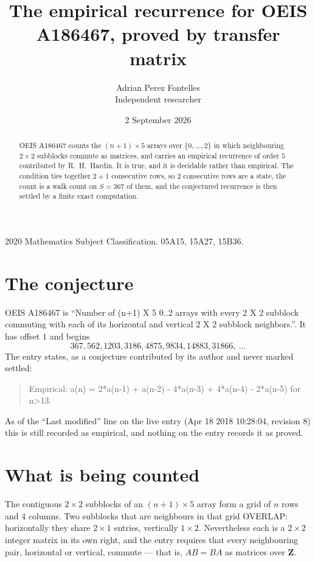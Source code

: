 \documentclass[11pt,a4paper]{article}
\title{The empirical recurrence for OEIS A186467, proved by transfer matrix}
\author{Adrian Perez Fontelles\\ \small Independent researcher}
\date{2 September 2026}
\theoremstyle{plain}
\theoremstyle{definition}
\begin{document}
\maketitle

\begin{abstract}
OEIS A186467 counts the $(n+1)\times5$ arrays over $\{0,\dots,2\}$ in which
neighbouring $2\times2$ subblocks commute as matrices, and carries an empirical recurrence
of order $5$ contributed by R.~H.~Hardin. It is true, and it is decidable rather than
empirical. The condition ties together $2+1$ consecutive rows, so $2$ consecutive rows are
a state, the count is a walk count on $S=367$ of them, and the conjectured recurrence is then
settled by a finite exact computation.
\end{abstract}

\noindent\small 2020 Mathematics Subject Classification. 05A15, 15A27, 15B36.\normalsize

\section{The conjecture}

OEIS A186467 is ``Number of (n+1) X 5 0..2 arrays with every 2 X 2 subblock commuting with each of its horizontal and vertical 2 X 2 subblock neighbors.''. It has offset $1$ and begins
\[
367, 562, 1203, 3186, 4875, 9834, 14883, 31866,\ \dots
\]
The entry states, as a conjecture contributed by its author and never marked settled:
\begin{quote}
Empirical: a(n) = 2*a(n-1) + a(n-2) - 4*a(n-3) + 4*a(n-4) - 2*a(n-5) for n>13.
\end{quote}
As of the ``Last modified'' line on the live entry (Apr 18 2018 10:28:04, revision 8) this is still
recorded as empirical, and nothing on the entry records it as proved.

\section{What is being counted}

The contiguous $2\times2$ subblocks of an $(n+1)\times5$ array form a grid of $n$
rows and $4$ columns. Two subblocks that are neighbours in that
grid OVERLAP: horizontally they share $2\times1$ entries, vertically
$1\times2$. Nevertheless each is a $2\times2$ integer matrix in its own right, and
the entry requires that every neighbouring pair, horizontal or vertical, commute --- that is,
$AB=BA$ as matrices over $\mathbf{Z}$.
\end{document}
